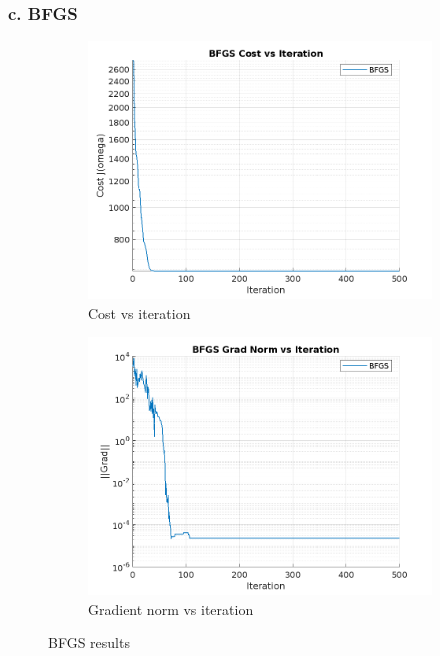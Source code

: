 \documentclass{article}
\begin{document}
\subsubsection{c. BFGS}
\begin{figure}[H]
  \centering
  \begin{subfigure}[b]{0.45\textwidth}
    \centering
    \includegraphics[width=\textwidth]{images/bfgs_cost_vs_iteration.png}
    \caption{Cost vs iteration}
    \label{fig:bfgs_cost}
  \end{subfigure}
  \begin{subfigure}[b]{0.45\textwidth}
    \centering
    \includegraphics[width=\textwidth]{images/bfgs_grad_norm_vs_iteration.png}
    \caption{Gradient norm vs iteration}
    \label{fig:bfgs_grad_norm}
  \end{subfigure}
  \caption{BFGS results}
  \label{fig:bfgs_results}
\end{figure}
\end{document}
